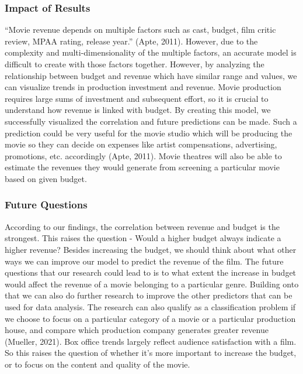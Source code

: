\documentclass[
]{article}
\begin{document}
\hypertarget{impact-of-results}{%
\subsubsection{Impact of Results}\label{impact-of-results}}

``Movie revenue depends on multiple factors such as cast, budget, film critic review, MPAA rating, release year.'' (Apte, 2011). However, due to the complexity and multi-dimensionality of the multiple factors, an accurate model is difficult to create with those factors together. However, by analyzing the relationship between budget and revenue which have similar range and values, we can visualize trends in production investment and revenue. Movie production requires large sums of investment and subsequent effort, so it is crucial to understand how revenue is linked with budget. By creating this model, we successfully visualized the correlation and future predictions can be made. Such a prediction could be very useful for the movie studio which will be producing the movie so they can decide on expenses like artist compensations, advertising, promotions, etc. accordingly (Apte, 2011). Movie theatres will also be able to estimate the revenues they would generate from screening a particular movie based on given budget.

\hypertarget{future-questions}{%
\subsubsection{Future Questions}\label{future-questions}}

According to our findings, the correlation between revenue and budget is the strongest. This raises the question - Would a higher budget always indicate a higher revenue? Besides increasing the budget, we should think about what other ways we can improve our model to predict the revenue of the film. The future questions that our research could lead to is to what extent the increase in budget would affect the revenue of a movie belonging to a particular genre. Building onto that we can also do further research to improve the other predictors that can be used for data analysis. The research can also qualify as a classification problem if we choose to focus on a particular category of a movie or a particular production house, and compare which production company generates greater revenue (Mueller, 2021). Box office trends largely reflect audience satisfaction with a film. So this raises the question of whether it's more important to increase the budget, or to focus on the content and quality of the movie.
\end{document}
